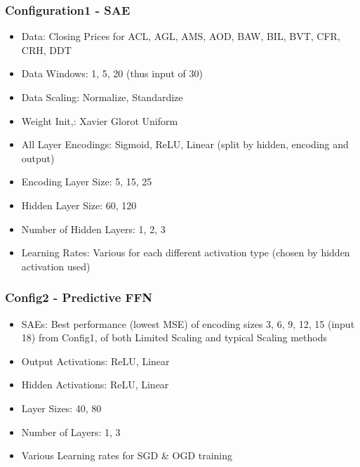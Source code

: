 \documentclass[a4paper,11pt,oneside]{article}
\theoremstyle{plain}
\theoremstyle{definition}
\begin{document}
\subsubsection{Configuration1 - SAE}\label{config1}

\begin{itemize}
	\item Data: Closing Prices for ACL, AGL, AMS, AOD, BAW, BIL, BVT, CFR, CRH, DDT
	\item Data Windows: 1, 5, 20 (thus input of 30)
	\item Data Scaling: Normalize, Standardize
	\item Weight Init,: Xavier Glorot Uniform
	\item All Layer Encodings: Sigmoid, ReLU, Linear (split by hidden, encoding and output)
	\item Encoding Layer Size: 5, 15, 25
	\item Hidden Layer Size: 60, 120
	\item Number of Hidden Layers: 1, 2, 3
	\item Learning Rates: Various for each different activation type (chosen by hidden activation used)
\end{itemize}

\subsubsection{Config2 - Predictive FFN}\label{config2}

\begin{itemize}
	\item SAEs: Best performance (lowest MSE) of encoding sizes 3, 6, 9, 12, 15 (input 18) from Config1, of both Limited Scaling and typical Scaling methods
	\item Output Activations: ReLU, Linear
	\item Hidden Activations: ReLU, Linear
	\item Layer Sizes: 40, 80
	\item Number of Layers: 1, 3
	\item Various Learning rates for SGD \& OGD training
\end{itemize}
\end{document}
